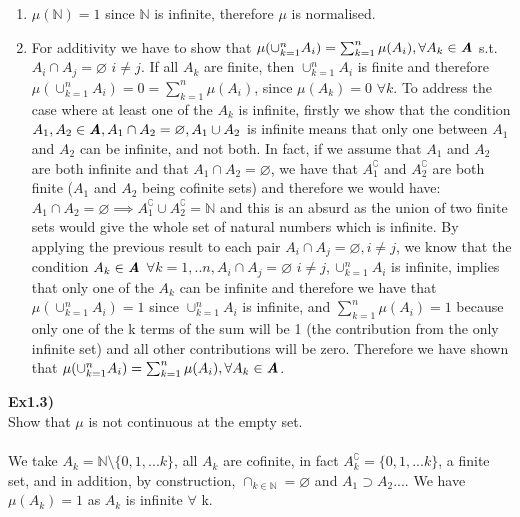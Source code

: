 \documentclass[12pt,mythesisstyle]{report}
\begin{document}
\begin{enumerate}
\item \(\mu(\mathbb{N})=1\) since \(\mathbb{N}\) is infinite, therefore \(\mu\) is normalised.\\
\item For additivity we have to show that \(\mu(\cup_{k=1}^nA_i)=\sum_{k=1}^n\mu(A_i), \forall A_k\in\textbf{\textit{A}}\) s.t. \(A_i\cap A_j=\varnothing\) \(i\neq j\). If all \(A_k\) are finite, then \(\cup_{k=1}^nA_i\) is finite and therefore \(\mu(\cup_{k=1}^nA_i)=0=\sum_{k=1}^n\mu(A_i)\), since \(\mu(A_k)=0\) \(\forall k\). To address the case where at least one of the \(A_k\) is infinite, firstly we show that the condition \(A_1, A_2\in\textbf{\textit{A}}, A_1\cap A_2=\varnothing, A_1\cup A_2\) is infinite means that only one between \(A_1\) and \(A_2\) can be infinite, and not both. In fact, if we assume that \(A_1\) and \(A_2\) are both infinite and that \(A_1\cap A_2=\varnothing\), we have that \(A_1^\complement\) and \(A_2^\complement\) are both finite (\(A_1\) and \(A_2\) being cofinite sets) and therefore we would have: \(A_1\cap A_2=\varnothing\implies A_1^\complement\cup A_2^\complement=\mathbb{N}\) and this is an absurd as the union of two finite sets would give the whole set of natural numbers which is infinite. By applying the previous result to each pair \(A_i\cap A_j=\varnothing,  i\neq j\), we know that the condition \(A_k\in\textbf{\textit{A}}\) \(\forall k=1,..n,A_i\cap A_j=\varnothing\) \(i\neq j,\cup_{k=1}^nA_i\) is infinite, implies that only one of the \(A_k\) can be infinite and therefore we have that \(\mu(\cup_{k=1}^nA_i)=1\) since \(\cup_{k=1}^nA_i\) is infinite, and \(\sum_{k=1}^n\mu(A_i)=1\) because only one of the k terms of the sum will be 1 (the contribution from the only infinite set) and all other contributions will be zero. Therefore we have shown that \(\mu(\cup_{k=1}^nA_i)=\sum_{k=1}^n\mu(A_i), \forall A_k\in\textbf{\textit{A}}\).\\
\end{enumerate}
\textbf{Ex1.3)}\\
Show that \(\mu\) is not continuous at the empty set.\\\\
We take $A_k=\mathbb{N}\setminus\{0,1,...k\}$, all $A_k$ are cofinite, in fact $A_k^\complement=\{0,1,...k\}$, a finite set, and in addition, by construction, $\cap_{k\in\mathbb{N}}=\varnothing$ and $A_1\supset A_2...$. We have $\mu(A_k)=1$ as $A_k$ is infinite $\forall$ k.
\end{document}
